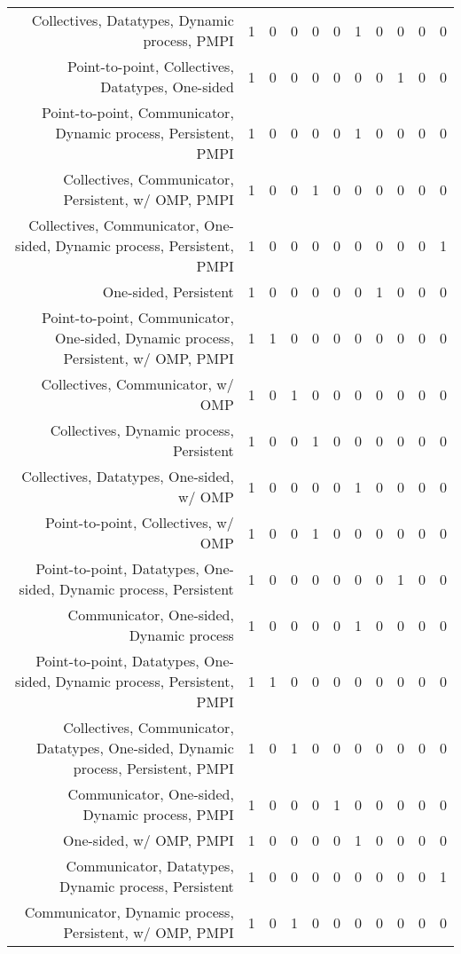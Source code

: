 {\begin{landscape}
\begin{longtable}[htb]{r|c|c|c|c|c|c|c|c|c|c}
{Collectives, Datatypes, Dynamic process, PMPI} & 1 & 0 & 0 & 0 & 0 & 1 & 0 & 0 & 0 & 0 \\%
{Point-to-point, Collectives, Datatypes, One-sided} & 1 & 0 & 0 & 0 & 0 & 0 & 0 & 1 & 0 & 0 \\%
{Point-to-point, Communicator, Dynamic process, Persistent, PMPI} & 1 & 0 & 0 & 0 & 0 & 1 & 0 & 0 & 0 & 0 \\%
{Collectives, Communicator, Persistent, w/ OMP, PMPI} & 1 & 0 & 0 & 1 & 0 & 0 & 0 & 0 & 0 & 0 \\%
{Collectives, Communicator, One-sided, Dynamic process, Persistent, PMPI} & 1 & 0 & 0 & 0 & 0 & 0 & 0 & 0 & 0 & 1 \\%
{One-sided, Persistent} & 1 & 0 & 0 & 0 & 0 & 0 & 1 & 0 & 0 & 0 \\%
{Point-to-point, Communicator, One-sided, Dynamic process, Persistent, w/ OMP, PMPI} & 1 & 1 & 0 & 0 & 0 & 0 & 0 & 0 & 0 & 0 \\%
{Collectives, Communicator, w/ OMP} & 1 & 0 & 1 & 0 & 0 & 0 & 0 & 0 & 0 & 0 \\%
{Collectives, Dynamic process, Persistent} & 1 & 0 & 0 & 1 & 0 & 0 & 0 & 0 & 0 & 0 \\%
{Collectives, Datatypes, One-sided, w/ OMP} & 1 & 0 & 0 & 0 & 0 & 1 & 0 & 0 & 0 & 0 \\%
{Point-to-point, Collectives, w/ OMP} & 1 & 0 & 0 & 1 & 0 & 0 & 0 & 0 & 0 & 0 \\%
{Point-to-point, Datatypes, One-sided, Dynamic process, Persistent} & 1 & 0 & 0 & 0 & 0 & 0 & 0 & 1 & 0 & 0 \\%
{Communicator, One-sided, Dynamic process} & 1 & 0 & 0 & 0 & 0 & 1 & 0 & 0 & 0 & 0 \\%
{Point-to-point, Datatypes, One-sided, Dynamic process, Persistent, PMPI} & 1 & 1 & 0 & 0 & 0 & 0 & 0 & 0 & 0 & 0 \\%
{Collectives, Communicator, Datatypes, One-sided, Dynamic process, Persistent, PMPI} & 1 & 0 & 1 & 0 & 0 & 0 & 0 & 0 & 0 & 0 \\%
{Communicator, One-sided, Dynamic process, PMPI} & 1 & 0 & 0 & 0 & 1 & 0 & 0 & 0 & 0 & 0 \\%
{One-sided, w/ OMP, PMPI} & 1 & 0 & 0 & 0 & 0 & 1 & 0 & 0 & 0 & 0 \\%
{Communicator, Datatypes, Dynamic process, Persistent} & 1 & 0 & 0 & 0 & 0 & 0 & 0 & 0 & 0 & 1 \\%
{Communicator, Dynamic process, Persistent, w/ OMP, PMPI} & 1 & 0 & 1 & 0 & 0 & 0 & 0 & 0 & 0 & 0 \\%

\end{longtable}
\end{landscape}}

